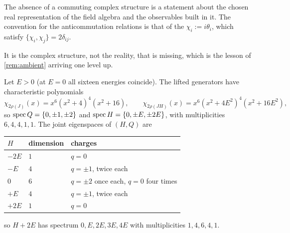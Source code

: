 The absence of a commuting complex structure is a statement about the chosen real representation of the field algebra and the observables
built in it. The convention for the anticommutation relations is that of the $\chi_i:=i\theta_i$, which satisfy $\{\chi_i,\chi_j\}=2\delta_{ij}$.

It is the complex structure, not the reality, that is missing, which is the lesson of \cref{rem:ambient} arriving one level up.

\begin{theorem}
\label{thm:spectra}
Let $E>0$ (at $E=0$ all sixteen energies coincide). The lifted generators have characteristic polynomials
\[
\chi_{2\rho(J)}(x)=x^6(x^2+4)^4(x^2+16),\qquad \chi_{2\rho(JH)}(x)=x^6(x^2+4E^2)^4(x^2+16E^2),
\]
so $\operatorname{spec} Q=\{0,\pm1,\pm2\}$ and $\operatorname{spec} H=\{0,\pm E,\pm2E\}$, with multiplicities $6,4,4,1,1$. The joint eigenspaces of $(H,Q)$ are
\begin{center}
\begin{tabular}{@{}lll@{}}
\toprule
$H$ & dimension & charges\\
\midrule
$-2E$ & $1$ & $q=0$\\
$-E$ & $4$ & $q=\pm1$, twice each\\
$0$ & $6$ & $q=\pm2$ once each, $q=0$ four times\\
$+E$ & $4$ & $q=\pm1$, twice each\\
$+2E$ & $1$ & $q=0$\\
\bottomrule
\end{tabular}
\end{center}
so $H+2E$ has spectrum $0,E,2E,3E,4E$ with multiplicities $1,4,6,4,1$.
\end{theorem}


